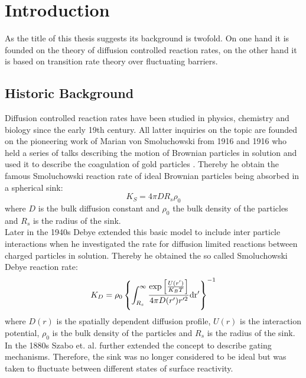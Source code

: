 \setcounter{page}{1}
\chapter{Introduction}

As the title of this thesis suggests its background is twofold. On one hand it is founded on the theory of diffusion controlled reaction rates, on the other hand it is based on transition rate theory over fluctuating barriers. \\
\section{Historic Background}
Diffusion controlled reaction rates have been studied in physics, chemistry and biology since the early 19th century. All latter inquiries on the topic are founded on the pioneering work of Marian von Smoluchowski from 1916 and 1916 who held a series of talks \cite{Smoluchowski1916} describing the motion of Brownian particles in solution and used it to describe the coagulation of gold particles \cite{Smoluchowski1917a}. Thereby he obtain the famous Smoluchowski reaction rate of ideal Brownian particles being absorbed in a spherical sink:\\
\begin{equation}
    K_S = 4 \pi D R_s \rho_0 \nonumber
    \label{Ksintro}
\end{equation}
where $D$ is the bulk diffusion constant and $\rho_0$ the bulk density of the particles and $R_s$ is the radius of the sink.\\
Later in the 1940s Debye \cite{Debye1942} extended this basic model to include inter particle interactions when he investigated the rate for diffusion limited reactions between charged particles in solution. Thereby he obtained the so called Smoluchowski Debye reaction rate:
\begin{equation}
    K_D = \rho_0\left\{\int_{R_s}^{\infty} \frac{\exp \left[ \frac{U(r')}{K_B T}\right]}{4 \pi D(r') r'^2} \rm d r' \right\}^{-1} \nonumber
    \label{Kdintro}
\end{equation}
where $D(r)$ is the spatially dependent diffusion profile, $U(r)$ is the interaction potential, $\rho_0$ is the bulk density of the particles and $R_s$ is the radius of the sink. \\
In the 1880s Szabo et. al. \cite{Szabo1982} further extended the concept to describe gating mechanisms. Therefore, the sink was no longer considered to be ideal but was taken to fluctuate between different states of surface reactivity. \\


